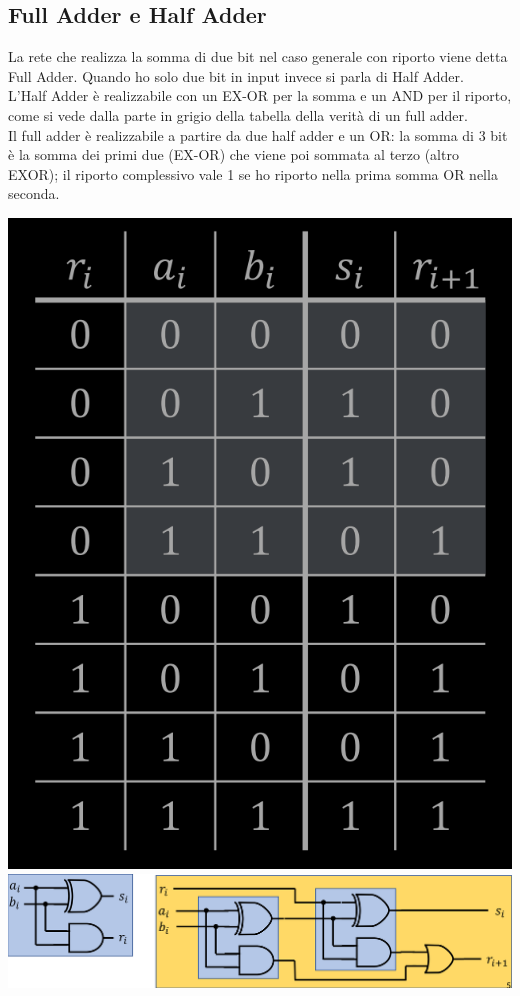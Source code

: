 \documentclass{article}
\begin{document}
\subsection{Full Adder e Half Adder}
La rete che realizza la somma di due bit nel caso generale con riporto viene detta {\color{cyan}Full Adder}. Quando ho solo due bit in input invece si parla di {\color{cyan}Half Adder}.
\vspace{0.1cm}\\
L’Half Adder è realizzabile con un EX-OR per la somma e un AND per il riporto, come si vede dalla parte in grigio della tabella della verità di un full adder.
\vspace{0.1cm}\\
Il full adder è realizzabile a partire da due half adder e un OR: la somma di 3 bit è la somma dei primi due (EX-OR) che viene poi sommata al terzo (altro EXOR); il riporto complessivo vale 1 se ho riporto nella prima somma OR nella seconda.
\begin{center}
    \includegraphics[scale=0.35]{TDV Full Adder.png}
    \includegraphics[scale=0.35]{Full Adder.png}
\end{center}
\end{document}
